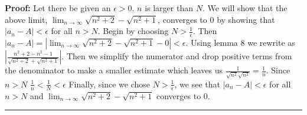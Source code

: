 \documentclass[12pt]{article}
\newcommand\qedsym{\hfill \rule{2mm}{2mm}}
\begin{document}
\bigskip

\textbf{Proof:} Let there be given an $\epsilon > 0$. $n$ is larger than $N$. We will show that the above limit, $\lim_{n\to \infty}\sqrt{n^2+2}-\sqrt{n^2+1}$, converges to $0$ by showing that $|a_n - A| < \epsilon$ for all $n > N$. Begin by choosing $N > \frac{1}{\epsilon}$. Then $|a_n - A| = | \lim_{n\to \infty}\sqrt{n^2+2}-\sqrt{n^2+1} - 0 | < \epsilon$. Using lemma 8 we rewrite as $|\frac{n^2+2-n^2-1}{\sqrt{n^2+2}+\sqrt{n^2+1}}|$. Then we simplify the numerator and drop positive terms from the denominator to make a smaller estimate which leaves us $\frac{1}{\sqrt{n^2}\sqrt{n^2}} = \frac{1}{n}$. Since $n>N$ $\frac{1}{n} < \frac{1}{N} < \epsilon$ Finally, since we chose $N > \frac{1}{\epsilon}$, we see that $|a_n - A| < \epsilon$ for all $n > N$ and $\lim_{n\to \infty}\sqrt{n^2+2}-\sqrt{n^2+1}$ converges to $0$.\qedsym{}
\end{document}

